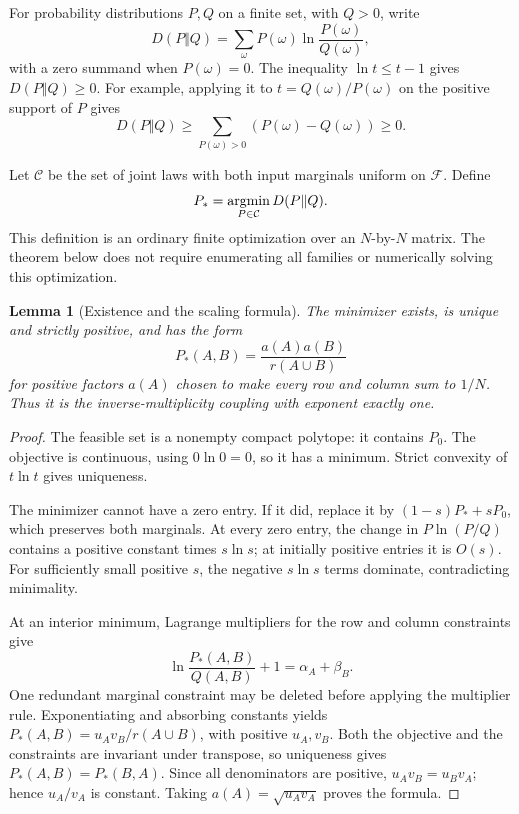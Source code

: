 \documentclass[11pt]{article}
\newtheorem{lemma}[theorem]{Lemma}
\theoremstyle{remark}
\newcommand{\F}{\mathcal F}
\begin{document}
For probability distributions \(P,Q\) on a finite set, with \(Q>0\),
write
\[
D(P\Vert Q)=\sum_\omega P(\omega)\ln\frac{P(\omega)}{Q(\omega)},
\]
with a zero summand when \(P(\omega)=0\).
The inequality \(\ln t\le t-1\) gives \(D(P\Vert Q)\ge0\).
For example, applying it to \(t=Q(\omega)/P(\omega)\) on the
positive support of \(P\) gives
\[
D(P\Vert Q)\ge\sum_{P(\omega)>0}(P(\omega)-Q(\omega))\ge0.
\]

Let \(\mathcal C\) be the set of joint laws with both input marginals
uniform on \(\F\). Define
\[
P_*=\mathop{\rm argmin}_{P\in\mathcal C}D(P\Vert Q).
\]
This definition is an ordinary finite optimization over an \(N\)-by-\(N\)
matrix. The theorem below does not require enumerating all families or
numerically solving this optimization.

\begin{lemma}[Existence and the scaling formula]\label{lem:global-scaling}
The minimizer exists, is unique and strictly positive, and has the form
\[
P_*(A,B)=\frac{a(A)a(B)}{r(A\cup B)}
\]
for positive factors \(a(A)\) chosen to make every row and column sum
to \(1/N\). Thus it is the inverse-multiplicity coupling with
exponent exactly one.
\end{lemma}
\begin{proof}
The feasible set is a nonempty compact polytope: it contains \(P_0\).
The objective is continuous, using \(0\ln0=0\), so it has a minimum.
Strict convexity of \(t\ln t\) gives uniqueness.

The minimizer cannot have a zero entry. If it did, replace it by
\((1-s)P_*+sP_0\), which preserves both marginals.
At every zero entry, the change in \(P\ln(P/Q)\) contains a positive
constant times \(s\ln s\); at initially positive entries it is \(O(s)\).
For sufficiently small positive \(s\), the negative \(s\ln s\) terms
dominate, contradicting minimality.

At an interior minimum, Lagrange multipliers for the row and column
constraints give
\[
\ln\frac{P_*(A,B)}{Q(A,B)}+1=\alpha_A+\beta_B.
\]
One redundant marginal constraint may be deleted before applying the
multiplier rule. Exponentiating and absorbing constants yields
\(P_*(A,B)=u_Av_B/r(A\cup B)\), with positive \(u_A,v_B\).
Both the objective and the constraints are invariant under transpose,
so uniqueness gives \(P_*(A,B)=P_*(B,A)\).
Since all denominators are positive, \(u_Av_B=u_Bv_A\); hence
\(u_A/v_A\) is constant. Taking \(a(A)=\sqrt{u_Av_A}\) proves the formula.
\end{proof}
\end{document}
